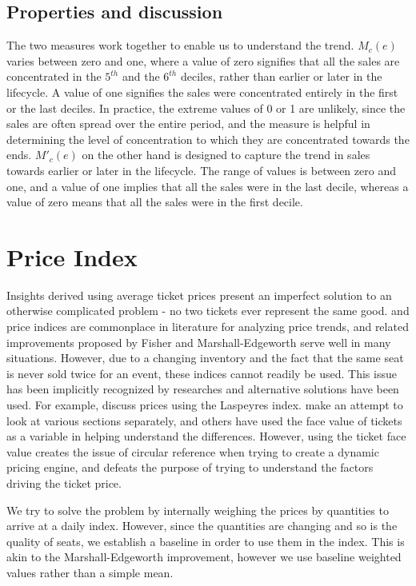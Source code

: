 \documentclass[letterpaper, 12pt]{article}
\begin{document}
\subsection{Properties and discussion}
The two measures work together to enable us to understand the trend. $M_c(e)$ varies between zero and one, where a value of zero signifies that all the sales are concentrated in the $5^{th}$ and the $6^{th}$ deciles, rather than earlier or later in the lifecycle. A value of one signifies the sales were concentrated entirely in the first or the last deciles. In practice, the extreme values of 0 or 1 are unlikely, since the sales are often spread over the entire period, and the measure is helpful in determining the level of concentration to which they are concentrated towards the ends. $M'_c(e)$ on the other hand is designed to capture the trend in sales towards earlier or later in the lifecycle. The range of values is between zero and one, and a value of one implies that all the sales were in the last decile, whereas a value of zero means that all the sales were in the first decile. 

\section{Price Index}\label{prm}
Insights derived using average ticket prices present an imperfect solution to an otherwise complicated problem - no two tickets ever represent the same good. \cite{paasche1874preisentwicklung} and \cite{laspeyres1871ix} price indices are commonplace in literature for analyzing price trends, and related improvements proposed by Fisher and Marshall-Edgeworth serve well in many situations. However, due to a changing inventory and the fact that the same seat is never sold twice for an event, these indices cannot readily be used. This issue has been implicitly recognized by researches and alternative solutions have been used. For example, \cite{tremblaynfl} discuss prices using the Laspeyres index. \cite{paul2013determinants} make an attempt to look at various sections separately, and others have used the face value of tickets as a variable in helping understand the differences. However, using the ticket face value creates the issue of circular reference when trying to create a dynamic pricing engine, and defeats the purpose of trying to understand the factors driving the ticket price.

We try to solve the problem by internally weighing the prices by quantities to arrive at a daily index. However, since the quantities are changing and so is the quality of seats, we establish a baseline in order to use them in the index. This is akin to the Marshall-Edgeworth improvement, however we use baseline weighted values rather than a simple mean.
\end{document}
